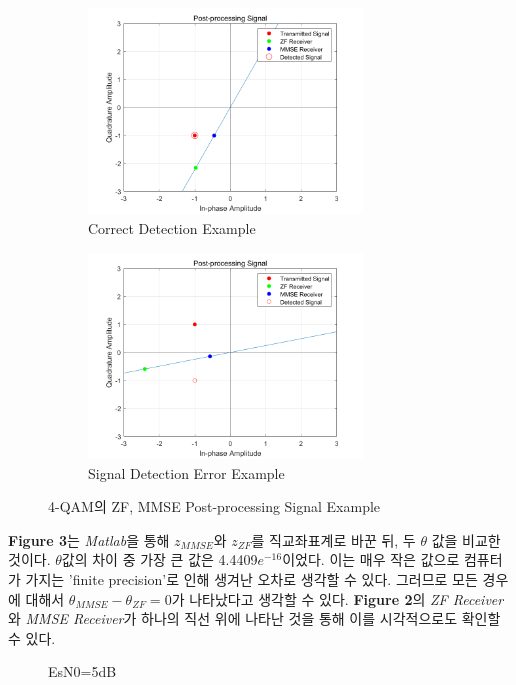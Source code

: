 \documentclass{article}
\newcommand{\bd}{\textbf} %
\begin{document}
\begin{figure}[!ht]
	\centering
	\begin{subfigure}{0.5\textwidth}
		\centerline{\includegraphics[width=0.8\textwidth]{4qam_correct.png}}
		\caption{Correct Detection Example}
	\end{subfigure}%
	\begin{subfigure}{0.5\textwidth}
		\centerline{\includegraphics[width=0.8\textwidth]{4qam_error.png}}
		\caption{Signal Detection Error Example}
	\end{subfigure}
	\caption{4-QAM의 ZF, MMSE Post-processing Signal Example}
\end{figure}

\bd{Figure 3}는 \textsl{Matlab}을 통해 $z_{MMSE}$와 $z_{ZF}$를 직교좌표계로 바꾼 뒤, 두 $\theta$ 값을 비교한 것이다. $\theta$값의 차이 중 가장 큰 값은 4.4409$e^{-16}$이었다. 이는 매우 작은 값으로 컴퓨터가 가지는 'finite precision'로 인해 생겨난 오차로 생각할 수 있다. 그러므로 모든 경우에 대해서 $\theta_{MMSE}-\theta_{ZF}=0$가 나타났다고 생각할 수 있다. \bd{Figure 2}의 \textsl{ZF Receiver}와 \textsl{MMSE Receiver}가 하나의 직선 위에 나타난 것을 통해 이를 시각적으로도 확인할 수 있다.
\begin{figure}[h]
	\centering
	\caption{EsN0=5dB}
\end{figure}
\end{document}
